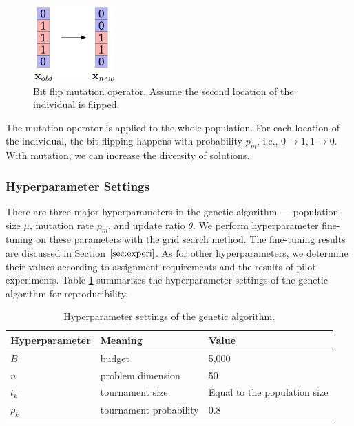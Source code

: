 \documentclass{article}
\begin{document}
\begin{figure}[!ht]
 \begin{center}    
     \includegraphics[width=0.28\textwidth]{ga/ga-mutation.png}
 \end{center}
 \caption{Bit flip mutation operator. Assume the second location of the individual is flipped.}
 \label{fig:al-ga-mutation}
\end{figure}

The mutation operator is applied to the whole population. For each location of the individual, the bit flipping happens with probability $p_m$, i.e., $0\rightarrow 1, 1 \rightarrow 0$. With mutation, we can increase the diversity of solutions.

\subsubsection{Hyperparameter Settings}
There are three major hyperparameters in the genetic algorithm --- population size $\mu$, mutation rate $p_m$, and update ratio $\theta$. We perform hyperparameter fine-tuning on these parameters with the grid search method. The fine-tuning results are discussed in Section $\ref{sec:experi}$. As for other hyperparameters, we determine their values according to assignment requirements and the results of pilot experiments. Table \ref{tab:al-ga-hyper} summarizes the hyperparameter settings of the genetic algorithm for reproducibility.

\begin{table}[!ht]
    \centering
    \caption{Hyperparameter settings of the genetic algorithm.}
    \label{tab:al-ga-hyper}
    \begin{tabular}{lll}
       \toprule
       \textbf{Hyperparameter} & \textbf{Meaning} & \textbf{Value}\\
       \midrule
       $B$ & budget & 5,000\\
       $n$ & problem dimension & 50\\
       $t_k$ & tournament size & Equal to the population size\\
       $p_k$ & tournament probability & 0.8\\
       \bottomrule
    \end{tabular}
\end{table}
\end{document}
